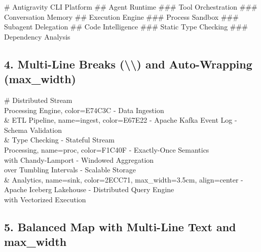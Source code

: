 \documentclass{article}
\begin{document}
\begin{mindchart}[layout=right, theme=business, style=boxed, line=elbow, scale=0.85]
# Antigravity CLI Platform
## Agent Runtime
### Tool Orchestration
### Conversation Memory
## Execution Engine
### Process Sandbox
### Subagent Delegation
## Code Intelligence
### Static Type Checking
### Dependency Analysis
\end{mindchart}

\newpage

\subsection*{4. Multi-Line Breaks (\textbackslash\textbackslash) and Auto-Wrapping (max\_width)}

\begin{mindchart}[layout=right, theme=sunset, style=classic, line=tapered, scale=0.78]
# Distributed Stream\\Processing Engine, color=E74C3C
  - Data Ingestion\\\& ETL Pipeline, name=ingest, color=E67E22
    - Apache Kafka Event Log
    - Schema Validation\\\& Type Checking
  - Stateful Stream\\Processing, name=proc, color=F1C40F
    - Exactly-Once Semantics\\with Chandy-Lamport
    - Windowed Aggregation\\over Tumbling Intervals
  - Scalable Storage\\\& Analytics, name=sink, color=2ECC71, max_width=3.5cm, align=center
    - Apache Iceberg Lakehouse
    - Distributed Query Engine\\with Vectorized Execution
\end{mindchart}

\bigskip

\subsection*{5. Balanced Map with Multi-Line Text and max\_width}
\end{document}
